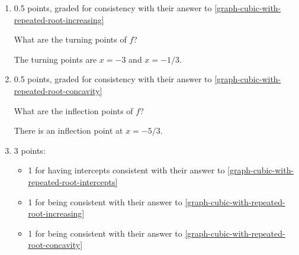 \documentclass{article}
\begin{document}
\begin{enumerate}
\begin{enumerate}
    \begin{solution}
      We need to determine the sign of $f''(x)=6x+10$. We can see
      that $f''(x)=0$ when $x=-5/3$, and since $y=f''(x)$ is a line
      with positive slope, $f''(x)$ is negative when $x<-5/3$ and positive
      when $x>5/3$. So $f$ is concave down on $(-\infty, -5/3)$ 
      and concave up on $(-5/3, \infty)$.
    \end{solution}

  \item

    \begin{grading}
      0.5 points, graded for consistency with their answer to \ref{graph-cubic-with-repeated-root-increasing}
    \end{grading}

    \begin{problem}[\vfill]
      What are the turning points of $f$?
    \end{problem}

    \begin{solution}
      The turning points are $x=-3$ and $x=-1/3$.
    \end{solution}

  \item

    \begin{grading}
      0.5 points, graded for consistency with their answer to \ref{graph-cubic-with-repeated-root-concavity} 
    \end{grading}

    \begin{problem}[\vfill]
      What are the inflection points of $f$? 
    \end{problem}

    \begin{solution}
      There is an inflection point at $x=-5/3$.
    \end{solution}

  \item

    \begin{grading}
      3 points:
      \begin{itemize}[nosep]
      \item 1 for having intercepts consistent with their answer to \ref{graph-cubic-with-repeated-root-intercepts}
      \item 1 for being consistent with their answer to \ref{graph-cubic-with-repeated-root-increasing}
      \item 1 for being consistent with their answer to \ref{graph-cubic-with-repeated-root-concavity} 
      \end{itemize}
    \end{grading}


\end{enumerate}
\end{enumerate}
\end{document}
